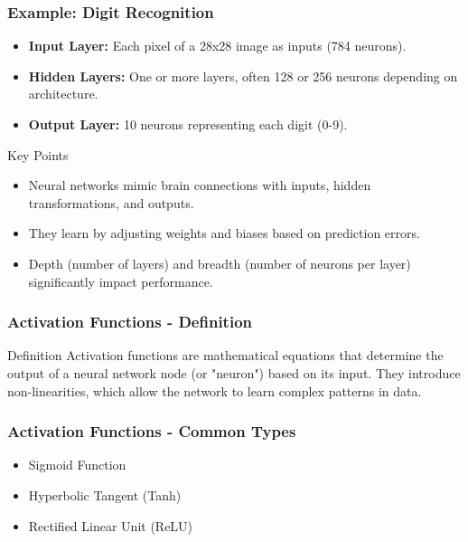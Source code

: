 \documentclass[aspectratio=169]{beamer}
\begin{document}
\begin{frame}[fragile]
    \frametitle{Example: Digit Recognition}
    \begin{itemize}
        \item \textbf{Input Layer:} Each pixel of a 28x28 image as inputs (784 neurons).
        \item \textbf{Hidden Layers:} One or more layers, often 128 or 256 neurons depending on architecture.
        \item \textbf{Output Layer:} 10 neurons representing each digit (0-9).
    \end{itemize}
    \begin{block}{Key Points}
        \begin{itemize}
            \item Neural networks mimic brain connections with inputs, hidden transformations, and outputs.
            \item They learn by adjusting weights and biases based on prediction errors.
            \item Depth (number of layers) and breadth (number of neurons per layer) significantly impact performance.
        \end{itemize}
    \end{block}
\end{frame}

\begin{frame}
    \frametitle{Activation Functions - Definition}
    \begin{block}{Definition}
        Activation functions are mathematical equations that determine the output of a neural network node (or "neuron") based on its input. 
        They introduce non-linearities, which allow the network to learn complex patterns in data.
    \end{block}
\end{frame}

\begin{frame}
    \frametitle{Activation Functions - Common Types}
    \begin{itemize}
        \item Sigmoid Function
        \item Hyperbolic Tangent (Tanh)
        \item Rectified Linear Unit (ReLU)
    \end{itemize}
\end{frame}
\end{document}
